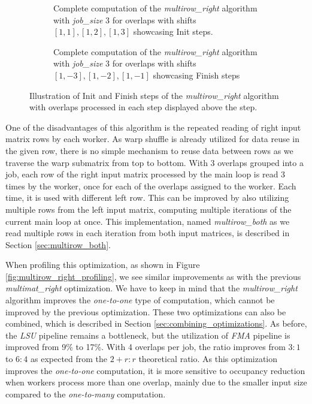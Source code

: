 \begin{figure}[ht]
	\centering	
	\begin{subfigure}{\textwidth}
		\centering
		\def\svgwidth{\textwidth}
		
		\caption{Complete computation of the \textit{multirow\_right} algorithm with \textit{job\_size} 3 for overlaps with shifts $[1, 1], [1, 2], [1, 3]$ showcasing Init steps.}
		\label{fig:multirow_init}
	\end{subfigure}
	\hfill
	\begin{subfigure}{\textwidth}
		\centering
		\def\svgwidth{\textwidth}
		
		\caption{Complete computation of the \textit{multirow\_right} algorithm with \textit{job\_size} 3 for overlaps with shifts $[1, -3], [1, -2], [1, -1]$ showcasing Finish steps}
		\label{fig:multirow_fini}
	\end{subfigure}
	
	\caption{Illustration of Init and Finish steps of the \textit{multirow\_right} algorithm with overlaps processed in each step displayed above the step.}
	\label{fig:multirow_right_steps}
\end{figure}



One of the disadvantages of this algorithm is the repeated reading of right input matrix rows by each worker. As warp shuffle is already utilized for data reuse in the given row, there is no simple mechanism to reuse data between rows as we traverse the warp submatrix from top to bottom. With 3 overlaps grouped into a job, each row of the right input matrix processed by the main loop is read 3 times by the worker, once for each of the overlaps assigned to the worker. Each time, it is used with different left row. This can be improved by also utilizing multiple rows from the left input matrix, computing multiple iterations of the current main loop at once. This implementation, named \textit{multirow\_both} as we read multiple rows in each iteration from both input matrices, is described in Section \ref{sec:multirow_both}.


When profiling this optimization, as shown in Figure \ref{fig:multirow_right_profiling}, we see similar improvements as with the previous \textit{multimat\_right} optimization. We have to keep in mind that the \textit{multirow\_right} algorithm improves the \textit{one-to-one} type of computation, which cannot be improved by the previous optimization. These two optimizations can also be combined, which is described in Section \ref{sec:combining_optimizations}. As before, the \textit{LSU} pipeline remains a bottleneck, but the utilization of \textit{FMA} pipeline is improved from 9\% to 17\%. With 4 overlaps per job, the ratio improves from $3 : 1$ to $6 : 4$ as expected from the $2 + r : r$ theoretical ratio. As this optimization improves the \textit{one-to-one} computation, it is more sensitive to occupancy reduction when workers process more than one overlap, mainly due to the smaller input size compared to the \textit{one-to-many} computation.

